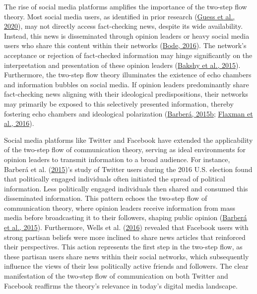 \documentclass[
  12pt,
]{article}
\begin{document}
The rise of social media platforms amplifies the importance of the
two-step flow theory. Most social media users, as identified in prior
research (\protect\hyperlink{ref-guess2020exposure}{Guess et al.,
2020}), may not directly access fact-checking news, despite its wide
availability. Instead, this news is disseminated through opinion leaders
or heavy social media users who share this content within their networks
(\protect\hyperlink{ref-bode2016political}{Bode, 2016}). The network's
acceptance or rejection of fact-checked information may hinge
significantly on the interpretation and presentation of these opinion
leaders (\protect\hyperlink{ref-bakshy2015exposure}{Bakshy et al.,
2015}). Furthermore, the two-step flow theory illuminates the existence
of echo chambers and information bubbles on social media. If opinion
leaders predominantly share fact-checking news aligning with their
ideological predispositions, their networks may primarily be exposed to
this selectively presented information, thereby fostering echo chambers
and ideological polarization
(\protect\hyperlink{ref-barbera2015social}{Barberá, 2015b};
\protect\hyperlink{ref-flaxman2016filter}{Flaxman et al., 2016}).

Social media platforms like Twitter and Facebook have extended the
applicability of the two-step flow of communication theory, serving as
ideal environments for opinion leaders to transmit information to a
broad audience. For instance, Barberá et al.
(\protect\hyperlink{ref-barbera2015tweeting}{2015})'s study of Twitter
users during the 2016 U.S. election found that politically engaged
individuals often initiated the spread of political information. Less
politically engaged individuals then shared and consumed this
disseminated information. This pattern echoes the two-step flow of
communication theory, where opinion leaders receive information from
mass media before broadcasting it to their followers, shaping public
opinion (\protect\hyperlink{ref-barbera2015tweeting}{Barberá et al.,
2015}). Furthermore, Wells et al.
(\protect\hyperlink{ref-wells2016coproduction}{2016}) revealed that
Facebook users with strong partisan beliefs were more inclined to share
news articles that reinforced their perspectives. This action represents
the first step in the two-step flow, as these partisan users share news
within their social networks, which subsequently influence the views of
their less politically active friends and followers. The clear
manifestation of the two-step flow of communication on both Twitter and
Facebook reaffirms the theory's relevance in today's digital media
landscape.
\end{document}
